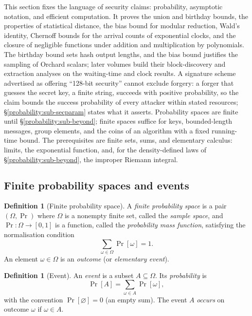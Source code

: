 \documentclass[11pt,a4paper]{article}
\theoremstyle{definition}
\newtheorem{definition}[theorem]{Definition}
\theoremstyle{remark}
\begin{document}
This section fixes the language of security claims: probability,
asymptotic notation, and efficient computation. It proves the union and
birthday bounds, the properties of statistical distance, the bias bound
for modular reduction, Wald's identity, Chernoff bounds for the arrival
counts of exponential clocks, and the closure of negligible functions
under addition and multiplication by polynomials. The birthday bound
sets hash output lengths, and the bias bound justifies the sampling of
Orchard scalars; later volumes build their block-discovery and
extraction analyses on the waiting-time and clock results. A signature
scheme advertised as offering ``128-bit security'' cannot exclude
forgery: a forger that guesses the secret key, a finite string,
succeeds with positive probability, so the claim bounds the success
probability of every attacker within stated resources;
\S\ref{probability:sub-secparam} states what it asserts. Probability
spaces are finite until \S\ref{probability:sub-beyond}; finite spaces
suffice for keys, bounded-length messages, group elements, and the coins of
an algorithm with a fixed running-time bound. The prerequisites are finite sets,
sums, and elementary calculus: limits, the exponential function, and,
for the density-defined laws of \S\ref{probability:sub-beyond}, the
improper Riemann integral.

\subsection{Finite probability spaces and events}

\begin{definition}[Finite probability space]\label{probability:def-space}
A \emph{finite probability space} is a pair \((\Omega, \Pr)\) where
\(\Omega\) is a nonempty finite set, called the \emph{sample space},
and \(\Pr\colon \Omega \to [0,1]\) is a function, called the
\emph{probability mass function}, satisfying the normalisation
condition
\[
\sum_{\omega \in \Omega} \Pr[\omega] = 1 .
\]
An element \(\omega \in \Omega\) is an \emph{outcome} (or
\emph{elementary event}).
\end{definition}

\begin{definition}[Event]\label{probability:def-event}
An \emph{event} is a subset \(A \subseteq \Omega\). Its
\emph{probability} is
\[
\Pr[A] = \sum_{\omega \in A} \Pr[\omega],
\]
with the convention \(\Pr[\varnothing] = 0\) (an empty sum). The event
\(A\) \emph{occurs} on outcome \(\omega\) if \(\omega \in A\).
\end{definition}
\end{document}
